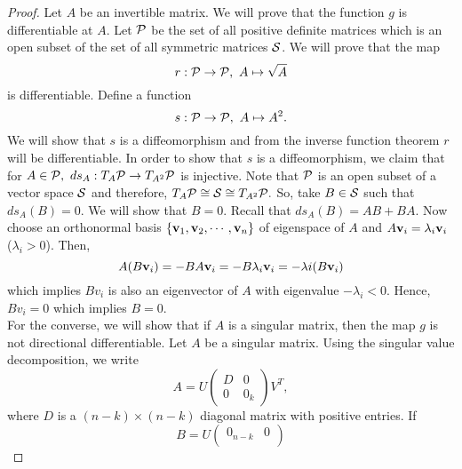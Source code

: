 \begin{proof}
    Let $A$ be an invertible matrix. We will prove that the function $g$ is differentiable at $A$. Let $\mathcal{P}$  be the set of all positive definite matrices which is an open subset of the set of all symmetric matrices $\mathcal{S}$. We will prove that the map 
    \begin{displaymath}
        r : \mathcal{P}\to \mathcal{P}, ~ A\mapsto \sqrt{A}
    \end{displaymath}
    is differentiable. Define a function 
    \begin{displaymath}
        s : \mathcal{P}\to \mathcal{P},~ A\mapsto A^2.
    \end{displaymath}
    We will show that $s$ is a diffeomorphism and from the inverse function theorem $r$ will be differentiable. In order to show that $s$ is a diffeomorphism, we claim that for $A\in \mathcal{P},~ds_{A}:T_{A}\mathcal{P}\to T_{A^2}\mathcal{P}$ is injective. Note that $\mathcal{P}$ is an open subset of a vector space $\mathcal{S}$ and therefore, $T_{A}\mathcal{P}\cong \mathcal{S} \cong T_{A^2}\mathcal{P}.$ So, take $B\in \mathcal{S}$ such that $ds_{A}(B) = 0$. We will show that $B = 0.$ Recall that $ds_{A}(B) = AB +BA.$ Now choose an orthonormal basis $\{\mathbf{v}_1,\mathbf{v}_2,\cdots,\mathbf{v}_n\}$ of eigenspace of $A$ and $A\mathbf{v}_{i} = \lambda_{i} \mathbf{v}_i$ ($\lambda_i>0$). Then,
    \begin{displaymath}
        A(B\mathbf{v}_i) = -BA\mathbf{v}_i = -B\lambda_i\mathbf{v}_i = -\lambda i(B\mathbf{v}_i)
    \end{displaymath} 
    which implies $Bv_{i}$ is also an eigenvector of $A$ with eigenvalue $-\lambda_{i}<0$. Hence, $Bv_{i} = 0$ which implies $B=0$.\\
    \hspace{0.7cm} For the converse, we will show that if $A$ is a singular matrix, then the map $g$ is not directional differentiable. Let $A$ be a singular matrix. Using the singular value decomposition, we write 
    \begin{displaymath}
        A = U \begin{pmatrix}
            D & 0 \\ 
            0   & 0_k
        \end{pmatrix} V^T,    
    \end{displaymath}
    where $D$ is a $(n-k)\times (n-k)$ diagonal matrix with positive entries. If 
    \begin{displaymath}
        B = U \begin{pmatrix}
            0_{n-k} & 0 \\

\end{pmatrix}
\end{displaymath}
\end{proof}
